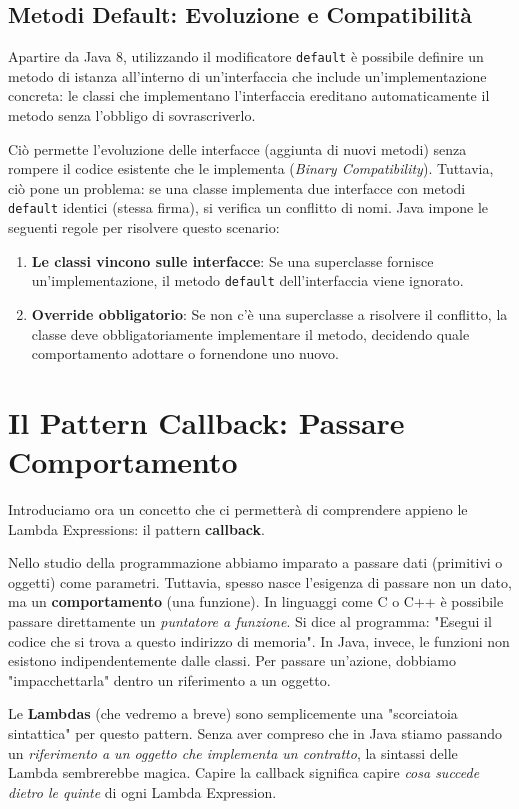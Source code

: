 \subsection{Metodi Default: Evoluzione e Compatibilità}
 Apartire da Java 8, utilizzando il modificatore \texttt{default} è possibile definire un metodo di istanza all'interno di un'interfaccia che include un'implementazione concreta: le classi che implementano l'interfaccia ereditano automaticamente il metodo senza l'obbligo di sovrascriverlo.

 Ciò permette l'evoluzione delle interfacce (aggiunta di nuovi metodi) senza rompere il codice esistente che le implementa (\textit{Binary Compatibility}). Tuttavia, ciò pone un problema: se una classe implementa due interfacce con metodi \texttt{default} identici (stessa firma), si verifica un conflitto di nomi. Java impone le seguenti regole per risolvere questo scenario:
\begin{enumerate}
    \item \textbf{Le classi vincono sulle interfacce}: Se una superclasse fornisce un'implementazione, il metodo \texttt{default} dell'interfaccia viene ignorato.
    \item \textbf{Override obbligatorio}: Se non c'è una superclasse a risolvere il conflitto, la classe deve obbligatoriamente implementare il metodo, decidendo quale comportamento adottare o fornendone uno nuovo.
\end{enumerate}

\section{Il Pattern Callback: Passare Comportamento}
Introduciamo ora un concetto che ci permetterà di comprendere appieno le Lambda Expressions: il pattern \textbf{callback}.

Nello studio della programmazione abbiamo imparato a passare dati (primitivi o oggetti) come parametri. Tuttavia, spesso nasce l'esigenza di passare non un dato, ma un \textbf{comportamento} (una funzione). In linguaggi come C o C++ è possibile passare direttamente un \textit{puntatore a funzione}. Si dice al programma: "Esegui il codice che si trova a questo indirizzo di memoria".
In Java, invece, le funzioni non esistono indipendentemente dalle classi. Per passare un'azione, dobbiamo "impacchettarla" dentro un riferimento a un oggetto. 

Le \textbf{Lambdas} (che vedremo a breve) sono semplicemente una "scorciatoia sintattica" per questo pattern. Senza aver compreso che in Java stiamo passando un \textit{riferimento a un oggetto che implementa un contratto}, la sintassi delle Lambda sembrerebbe magica. Capire la callback significa capire \textit{cosa succede dietro le quinte} di ogni Lambda Expression.



